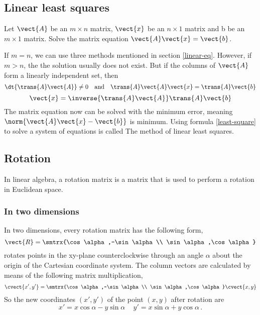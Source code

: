 \subsection{Linear least squares}
Let $\vect{A}$ be an $m\times n$ matrix, $\vect{x}$ be an $n\times 1$ matrix and b be an $m\times 1$ matrix. Solve the matrix equation $\vect{A}\vect{x}=\vect{b}$.\par 
If $m=n$, we can use three methods mentioned in section \ref{linear-eq}. However, if $m>n$, the the solution usually does not exist. But if the columns of $\vect{A}$ form a linearly independent set, then 
\begin{equation}
\dt{\trans{A}\vect{A}}\neq 0 \quad \text{and} \quad \trans{A}\vect{A}\vect{x}=\trans{A}\vect{b}
\end{equation}
\begin{equation}\label{least-square}
\vect{x}=\inverse{\trans{A}\vect{A}}\trans{A}\vect{b}
\end{equation}
The matrix equation now can be solved with the minimum error, meaning $\norm{\vect{A}\vect{x}-\vect{b}}$ is minimum. Using formula \eqref{least-square} to solve a system of equations is called The method of linear least squares.
\subsection{Rotation}
In linear algebra, a rotation matrix is a matrix that is used to perform a rotation in Euclidean space.
\subsubsection{In two dimensions}
In two dimensions, every rotation matrix has the following form,
\[ \vect{R}=\smtrx{\cos\alpha,-\sin\alpha\\ \sin\alpha,\cos\alpha} \]
rotates points in the xy-plane counterclockwise through an angle $\alpha$ about the origin of the Cartesian coordinate system. The column vectors are calculated by means of the following matrix multiplication,
\begin{equation*}
\cvect{x',y'}=\smtrx{\cos\alpha,-\sin\alpha\\ \sin\alpha,\cos\alpha}\cvect{x,y}
\end{equation*}
So the new coordinates $\left( x',y' \right)$ of the point $\left( x,y \right)$ after rotation are
\[
 x'=x\cos \alpha -y\sin \alpha \, \quad
 y'=x\sin \alpha +y\cos \alpha \,.
\]
